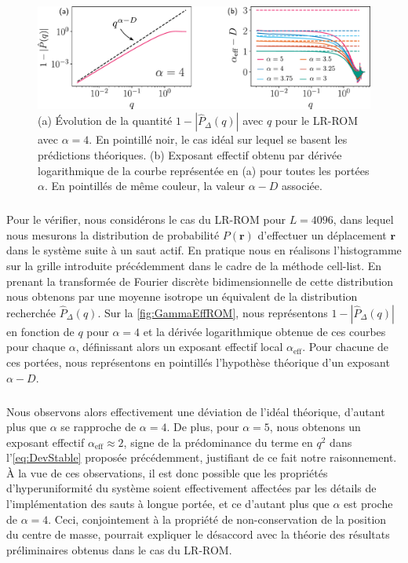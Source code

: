 \begin{figure}[h]
	\centering
	\includegraphics[width=\textwidth]{Chapitre2/Figures/Hyperuniformity/GammaEff_ROM.pdf}
	\caption{(a) Évolution de la quantité $1-|\hat{P}_\Delta (q)|$ avec $q$ pour le LR-ROM avec $\alpha=4$. En pointillé noir, le cas idéal sur lequel se basent les prédictions théoriques. (b) Exposant effectif obtenu par dérivée logarithmique de la courbe représentée en (a) pour toutes les portées $\alpha$. En pointillés de même couleur, la valeur $\alpha-D$ associée.}
	\label{fig:GammaEffROM}
\end{figure}

\subparagraph{}Pour le vérifier, nous considérons le cas du LR-ROM pour $L=4096$, dans lequel nous mesurons la distribution de probabilité $P(\mathbf{r})$ d'effectuer un déplacement $\mathbf{r}$ dans le système suite à un saut actif. En pratique nous en réalisons l'histogramme sur la grille introduite précédemment dans le cadre de la méthode cell-list. En prenant la transformée de Fourier discrète bidimensionnelle de cette distribution nous obtenons par une moyenne isotrope un équivalent de la distribution recherchée $\hat{P}_\Delta (q)$. Sur la \autoref{fig:GammaEffROM}, nous représentons $1-|\hat{P}_\Delta (q)|$ en fonction de $q$ pour $\alpha=4$ et la dérivée logarithmique obtenue de ces courbes pour chaque $\alpha$, définissant alors un exposant effectif local $\alpha_\text{eff}$. Pour chacune de ces portées, nous représentons en pointillés l'hypothèse théorique d'un exposant $\alpha-D$.

\subparagraph{}Nous observons alors effectivement une déviation de l'idéal théorique, d'autant plus que $\alpha$ se rapproche de $\alpha = 4$. De plus, pour $\alpha=5$, nous obtenons un exposant effectif $\alpha_\text{eff}\approx2$, signe de la prédominance du terme en $q^2$ dans l'\autoref{eq:DevStable} proposée précédemment, justifiant de ce fait notre raisonnement.
\`A la vue de ces observations, il est donc possible que les propriétés d'hyperuniformité du système soient effectivement affectées par les détails de l'implémentation des sauts à longue portée, et ce d'autant plus que $\alpha$ est proche de $\alpha=4$. Ceci, conjointement à la propriété de non-conservation de la position du centre de masse, pourrait expliquer le désaccord avec la théorie des résultats préliminaires obtenus dans le cas du LR-ROM.

